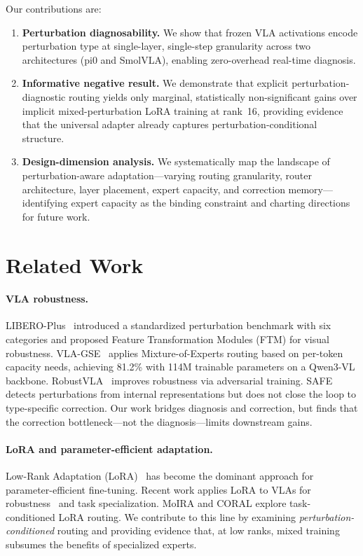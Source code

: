 \documentclass[letterpaper]{article}
\newcommand{\libeplus}{LIBERO-Plus}
\begin{document}
Our contributions are:
\begin{enumerate}
    \item \textbf{Perturbation diagnosability.} We show that frozen VLA activations encode perturbation type at single-layer, single-step granularity across two architectures (pi0 and SmolVLA), enabling zero-overhead real-time diagnosis.
    \item \textbf{Informative negative result.} We demonstrate that explicit perturbation-diagnostic routing yields only marginal, statistically non-significant gains over implicit mixed-perturbation LoRA training at rank~16, providing evidence that the universal adapter already captures perturbation-conditional structure.
    \item \textbf{Design-dimension analysis.} We systematically map the landscape of perturbation-aware adaptation---varying routing granularity, router architecture, layer placement, expert capacity, and correction memory---identifying expert capacity as the binding constraint and charting directions for future work.
\end{enumerate}

\section{Related Work}
\label{sec:related}

\paragraph{VLA robustness.}
\libeplus{}~\cite{zhou2025liberoplus} introduced a standardized perturbation benchmark with six categories and proposed Feature Transformation Modules (FTM) for visual robustness.
VLA-GSE~\cite{qu2025vlags} applies Mixture-of-Experts routing based on per-token capacity needs, achieving 81.2\% with 114M trainable parameters on a Qwen3-VL backbone.
RobustVLA~\cite{wang2025robustvla} improves robustness via adversarial training.
SAFE~\cite{zhang2025safe} detects perturbations from internal representations but does not close the loop to type-specific correction.
Our work bridges diagnosis and correction, but finds that the correction bottleneck---not the diagnosis---limits downstream gains.

\paragraph{LoRA and parameter-efficient adaptation.}
Low-Rank Adaptation (LoRA)~\cite{hu2022lora} has become the dominant approach for parameter-efficient fine-tuning.
Recent work applies LoRA to VLAs for robustness~\cite{zhou2025liberoplus} and task specialization.
MoIRA and CORAL explore task-conditioned LoRA routing.
We contribute to this line by examining \emph{perturbation-conditioned} routing and providing evidence that, at low ranks, mixed training subsumes the benefits of specialized experts.
\end{document}
